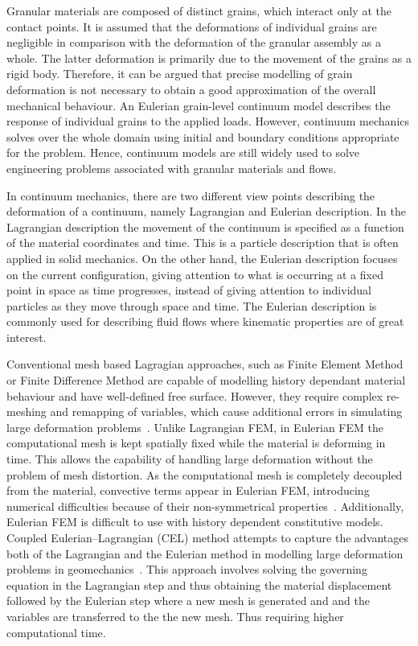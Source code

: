 Granular materials are composed of distinct grains, which interact only at 
the contact points. It is assumed that the deformations of individual grains 
are negligible in comparison with the deformation of the granular assembly as a 
whole. The latter deformation is primarily due to the movement of the grains as 
a rigid body. Therefore, it can be argued that precise modelling of grain 
deformation is not necessary to obtain a good approximation of the overall 
mechanical behaviour. An Eulerian grain-level continuum model describes the 
response of individual grains to the applied loads. However, continuum 
mechanics solves over the whole domain using initial and boundary conditions 
appropriate for the problem. Hence, continuum models are still widely used to 
solve engineering problems associated with granular materials and flows.

In continuum mechanics, there are two different view points describing the 
deformation of a continuum, namely Lagrangian and Eulerian 
description. In the Lagrangian description  the movement of the continuum is 
specified as a function of the material coordinates and time. This is a 
particle description that is often applied in solid mechanics. On the other 
hand, the Eulerian description focuses on the current configuration, giving 
attention to what is occurring at a fixed point in space as time progresses, 
instead of giving attention to individual particles as they move through space 
and time. The Eulerian description is commonly used for describing fluid flows 
where kinematic properties are of great interest. 

Conventional mesh based Lagragian approaches, such as Finite Element Method or 
Finite Difference Method are capable of modelling history dependant material 
behaviour and have well-defined free surface. However, they require complex 
re-meshing and remapping of variables, which cause additional errors in 
simulating large deformation problems~\citep{Li2002}. Unlike Lagrangian FEM, in 
Eulerian FEM the computational mesh is kept spatially fixed while the material 
is deforming in time. This allows the capability of handling large deformation 
without the problem of mesh distortion. As the computational mesh is completely 
decoupled from the material, convective terms appear in Eulerian FEM, 
introducing numerical difficulties because of their non-symmetrical 
properties~\citep{Donea1982}. Additionally, Eulerian FEM is difficult to use
with history dependent constitutive models. Coupled Eulerian–Lagrangian (CEL) 
method attempts to capture the advantages both of the Lagrangian and the 
Eulerian method in modelling large deformation problems in 
geomechanics~\citep{Qiu2011}. This approach involves solving the governing 
equation in the Lagrangian step and thus obtaining the material displacement 
followed by the Eulerian step where a new mesh is generated and and the 
variables are transferred to the the new mesh. Thus requiring higher
computational time. 

